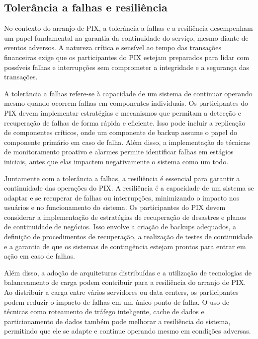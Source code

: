 \documentclass[12pt]{article}
\begin{document}
\subsection{Tolerância a falhas e resiliência} \label{sec:tecnologia}

No contexto do arranjo de PIX, a tolerância a falhas e a resiliência desempenham um papel fundamental na garantia da continuidade do serviço, mesmo diante de eventos adversos. A natureza crítica e sensível ao tempo das transações financeiras exige que os participantes do PIX estejam preparados para lidar com possíveis falhas e interrupções sem comprometer a integridade e a segurança das transações.

A tolerância a falhas refere-se à capacidade de um sistema de continuar operando mesmo quando ocorrem falhas em componentes individuais. Os participantes do PIX devem implementar estratégias e mecanismos que permitam a detecção e recuperação de falhas de forma rápida e eficiente. Isso pode incluir a replicação de componentes críticos, onde um componente de backup assume o papel do componente primário em caso de falha. Além disso, a implementação de técnicas de monitoramento proativo e alarmes permite identificar falhas em estágios iniciais, antes que elas impactem negativamente o sistema como um todo.

Juntamente com a tolerância a falhas, a resiliência é essencial para garantir a continuidade das operações do PIX. A resiliência é a capacidade de um sistema se adaptar e se recuperar de falhas ou interrupções, minimizando o impacto nos usuários e no funcionamento do sistema. Os participantes do PIX devem considerar a implementação de estratégias de recuperação de desastres e planos de continuidade de negócios. Isso envolve a criação de backups adequados, a definição de procedimentos de recuperação, a realização de testes de continuidade e a garantia de que os sistemas de contingência estejam prontos para entrar em ação em caso de falhas.

Além disso, a adoção de arquiteturas distribuídas e a utilização de tecnologias de balanceamento de carga podem contribuir para a resiliência do arranjo de PIX. Ao distribuir a carga entre vários servidores ou data centers, os participantes podem reduzir o impacto de falhas em um único ponto de falha. O uso de técnicas como roteamento de tráfego inteligente, cache de dados e particionamento de dados também pode melhorar a resiliência do sistema, permitindo que ele se adapte e continue operando mesmo em condições adversas.
\end{document}
